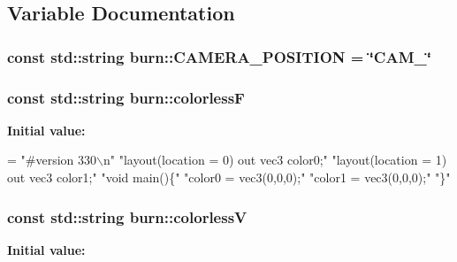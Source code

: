 \subsection{Variable Documentation}
\hypertarget{namespaceburn_aea213969ba83f20b14023eac83ce7f04}{
\subsubsection[{C\-A\-M\-E\-R\-A\-\_\-\-P\-O\-S\-I\-T\-I\-O\-N}]{\setlength{\rightskip}{0pt plus 5cm}const std\-::string burn\-::\-C\-A\-M\-E\-R\-A\-\_\-\-P\-O\-S\-I\-T\-I\-O\-N = \char`\"{}C\-A\-M\-\_\-\char`\"{}}}\label{namespaceburn_aea213969ba83f20b14023eac83ce7f04}
\hypertarget{namespaceburn_ad168558e196bd8b02d6da9e256dd01c7}{
\subsubsection[{colorless\-F}]{\setlength{\rightskip}{0pt plus 5cm}const std\-::string burn\-::colorless\-F}}\label{namespaceburn_ad168558e196bd8b02d6da9e256dd01c7}
{\bfseries Initial value\-:}
\begin{DoxyCode}
= \textcolor{stringliteral}{"#version 330\(\backslash\)n"}
        \textcolor{stringliteral}{"layout(location = 0) out vec3 color0;"}
        \textcolor{stringliteral}{"layout(location = 1) out vec3 color1;"}
        \textcolor{stringliteral}{"void main()\{"}
        \textcolor{stringliteral}{"color0 = vec3(0,0,0);"}
        \textcolor{stringliteral}{"color1 = vec3(0,0,0);"}
        \textcolor{stringliteral}{"\}"}
\end{DoxyCode}
\hypertarget{namespaceburn_ac819ca068b6bba609abb0f725fa3b778}{
\subsubsection[{colorless\-V}]{\setlength{\rightskip}{0pt plus 5cm}const std\-::string burn\-::colorless\-V}}\label{namespaceburn_ac819ca068b6bba609abb0f725fa3b778}
{\bfseries Initial value\-:}

